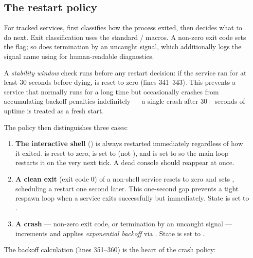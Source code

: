 \subsection{The restart policy}

For tracked services,  first classifies how the process
exited, then decides what to do next. Exit classification uses the standard
/ macros. A non-zero exit code sets the
 flag; so does termination by an uncaught signal, which additionally
logs the signal name using  for human-readable
diagnostics.

A \emph{stability window} check runs before any restart decision: if the service
ran for at least 30 seconds before dying,  is reset to zero
(lines 341--343). This prevents a service that normally runs for a long time but
occasionally crashes from accumulating backoff penalties indefinitely --- a
single crash after 30+ seconds of uptime is treated as a fresh start.

The policy then distinguishes three cases:

\begin{enumerate}
  \item \textbf{The interactive shell} () is
        always restarted immediately regardless of how it exited.
         is reset to zero,  is set to
         (not ), and  is set to
         so the main loop restarts it on the very next
        tick. A dead console should reappear at once.

  \item \textbf{A clean exit} (exit code 0) of a non-shell service resets
         to zero and sets ,
        scheduling a restart one second later. This one-second gap prevents a
        tight respawn loop when a service exits successfully but immediately.
        State is set to .

  \item \textbf{A crash} --- non-zero exit code, or termination by an uncaught
        signal --- increments  and applies
        \emph{exponential backoff} via . State is set to
        .
\end{enumerate}

The backoff calculation (lines 351--360) is the heart of the crash policy:

